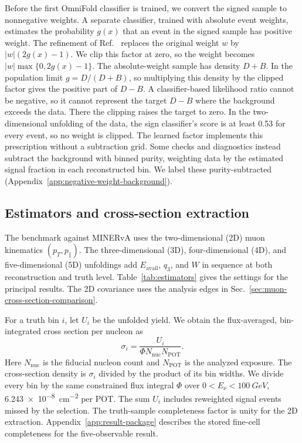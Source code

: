 Before the first OmniFold classifier is trained, we convert the signed sample to nonnegative weights. A separate classifier, trained with absolute event weights, estimates the probability $g(x)$ that an event in the signed sample has positive weight. The refinement of Ref.~\cite{Nachman:2025staypositive} replaces the original weight $w$ by $|w|(2g(x)-1)$. We clip this factor at zero, so the weight becomes $|w|\max\{0,2g(x)-1\}$. The absolute-weight sample has density $D+B$. In the population limit $g=D/(D+B)$, so multiplying this density by the clipped factor gives the positive part of $D-B$. A classifier-based likelihood ratio cannot be negative, so it cannot represent the target $D-B$ where the background exceeds the data. There the clipping raises the target to zero. In the two-dimensional unfolding of the data, the sign classifier's score is at least 0.53 for every event, so no weight is clipped. The learned factor implements this prescription without a subtraction grid. Some checks and diagnostics instead subtract the background with binned purity, weighting data by the estimated signal fraction in each reconstructed bin. We label these purity-subtracted (Appendix~\ref{app:negative-weight-background}).

\subsection{Estimators and cross-section extraction}
\label{sec:estimators-and-extraction}
\label{sec:method-config}

The benchmark against MINERvA uses the two-dimensional (2D) muon kinematics $(p_T,p_\parallel)$. The three-dimensional (3D), four-dimensional (4D), and five-dimensional (5D) unfoldings add $E_{\mathrm{avail}}$, $q_3$, and $W$ in sequence at both reconstruction and truth level. Table~\ref{tab:estimators} gives the settings for the principal results. The 2D covariance uses the analysis edges in Sec.~\ref{sec:muon-cross-section-comparison}.

\label{sec:method-xsec}
For a truth bin $i$, let $U_i$ be the unfolded yield. We obtain the flux-averaged, bin-integrated cross section per nucleon as
\begin{equation}
  \sigma_i = \frac{U_i}{\Phi N_{\mathrm{nuc}}N_{\mathrm{POT}}} .
  \label{eq:flux-averaged-cross-section}
\end{equation}
Here $N_{\mathrm{nuc}}$ is the fiducial nucleon count and $N_{\mathrm{POT}}$ is the analyzed exposure. The cross-section density is $\sigma_i$ divided by the product of its bin widths. We divide every bin by the same constrained flux integral $\Phi$ over $0<E_\nu<\SI{100}{GeV}$, \SI{6.243e-8}{cm^{-2}} per POT. The sum $U_i$ includes reweighted signal events missed by the selection. The truth-sample completeness factor is unity for the 2D extraction. Appendix~\ref{app:result-package} describes the stored fine-cell completeness for the five-observable result.

